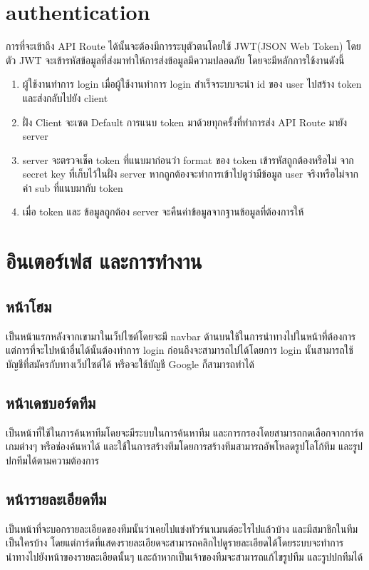 \section{authentication}
การที่จะเข้าถึง API Route ได้นั้นจะต้องมีการระบุตัวตนโดยใช้ JWT(JSON Web Token) โดยตัว JWT จะเข้ารหัสข้อมูลที่ส่งมาทำให้การส่งข้อมูลมีความปลอดภัย
โดยจะมีหลักการใช้งานดังนี้
\begin{enumerate}
  \item ผู้ใช้งานทำการ login เมื่อผู้ใช้งานทำการ login สำเร็จระบบจะนำ id ของ user ไปสร้าง token และส่งกลับไปยัง client
  \item ฝั่ง Client จะเซต Default การแนบ token มาด้วยทุกครั้งที่ทำการส่ง API Route มายัง server
  \item server จะตรวจเช็ค token ที่แนบมาก่อนว่า format ของ token เข้ารหัสถูกต้องหรือไม่ จาก secret key ที่เก็บไว้ในฝั่ง server หากถูกต้องจะทำการเข้าไปดูว่ามีข้อมูล user จริงหรือไม่จากค่า sub ที่แนบมากับ token
  \item เมื่อ token และ ข้อมูลถูกต้อง server จะคืนค่าข้อมูลจากฐานข้อมูลที่ต้องการให้
\end{enumerate}


\section{อินเตอร์เฟส และการทำงาน}
\subsection{หน้าโฮม}
เป็นหน้าแรกหลังจากเขามาในเว็ปไซต์โดยจะมี navbar ด้านบนใช้ในการนำทางไปในหน้าที่ต้องการ
แต่การที่จะไปหน้าอื่นได้นั้นต้องทำการ login ก่อนถึงจะสามารถไปได้โดยการ login นั้นสามารถใช้บัญชีที่สมัครกับทางเว็ปไซต์ได้ หรือจะใช้บัญชี Google ก็สามารถทำได้
\subsection{หน้าเดชบอร์ดทีม}
เป็นหน้าที่ใช้ในการค้นหาทีมโดยจะมีระบบในการค้นหาทีม และการกรองโดยสามารถกดเลือกจากการ์ดเกมต่างๆ หรือช่องค้นหาได้ และใช้ในการสร้างทีมโดยการสร้างทีมสามารถอัพโหลดรูปโลโก้ทีม และรูปปกทีมได้ตามความต้องการ
\subsection{หน้ารายละเอียดทีม}
เป็นหน้าที่จะบอกรายละเอียดของทีมนั้นว่าเคยไปแข่งทัวร์นาเมนต์อะไรไปแล้วบ้าง และมีสมาชิกในทีมเป็นใครบ้าง โดยแต่การ์ดที่แสดงรายละเอียดจะสามารถคลิกไปดูรายละเอียดได้โดยระบบจะทำการนำทางไปยังหน้าของรายละเอียดนั้นๆ
และถ้าหากเป็นเจ้าของทีมจะสามารถแก้ไขรูปทีม และรูปปกทีมได้
